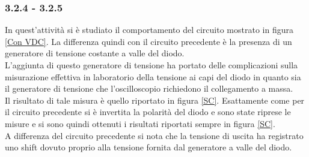\subsubsection{3.2.4 - 3.2.5}
In quest'attività si è studiato il comportamento del circuito mostrato in figura \ref{Con VDC}.
La differenza quindi con il circuito precedente è la presenza di un generatore di tensione costante a valle del diodo.\\
L'aggiunta di questo generatore di tensione ha portato delle complicazioni sulla misurazione effettiva in laboratorio della tensione ai capi del diodo in quanto sia il generatore di tensione che l'oscilloscopio richiedono il collegamento a massa.\\
Il risultato di tale misura è quello riportato in figura \ref{SC}.
Esattamente come per il circuito precedente si è invertita la polarità del diodo e sono state riprese le misure e si sono quindi ottenuti i risultati riportati sempre in figura \ref{SC}.\\
A differenza del circuito precedente si nota che la tensione di uscita ha registrato uno shift dovuto proprio alla tensione fornita dal generatore a valle del diodo.
